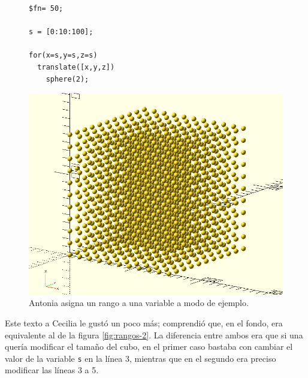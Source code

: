   \begin{figure}[ht]    
  \begin{minipage}[]{.5\textwidth}
    \begin{lstlisting}
$fn= 50;

s = [0:10:100];

for(x=s,y=s,z=s)
  translate([x,y,z])
    sphere(2);
\end{lstlisting}%
  \end{minipage}\hfill
    \begin{minipage}[]{.5\textwidth}
      \centering
      \includegraphics[width=.8\textwidth]{imagenes/cubo-de-esferas}
    \end{minipage}
    \caption{Antonia asigna un rango a una variable a modo de
      ejemplo.}
      \label{fig:rangos-1}
    \end{figure}


    Este texto a Cecilia le gustó un poco más; comprendió que, en el
    fondo, era equivalente al de la figura \ref{fig:rangos-2}. La
    diferencia entre ambos era que si una quería modificar el tamaño
    del cubo, en el primer caso bastaba con cambiar el valor de la
    variable \texttt{s} en la línea 3, mientras que en el segundo era
    preciso modificar las líneas 3 a 5.

